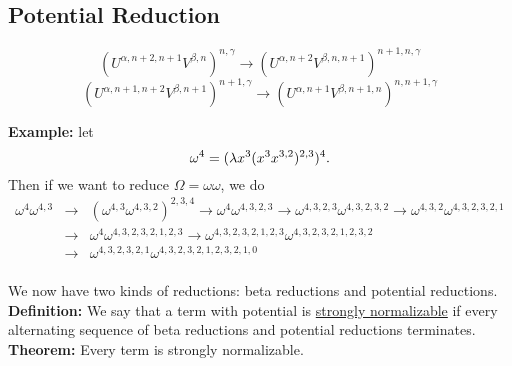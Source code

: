 \subsection{Potential Reduction}
\begin{equation*}
  (U^{\alpha,n+2,n+1}V^{\beta,n})^{n,\gamma} \rightarrow (U^{\alpha,n+2}V^{\beta,n,n+1})^{n+1,n,\gamma}
\end{equation*}
\begin{equation*}
  (U^{\alpha,n+1,n+2}V^{\beta,n+1})^{n+1,\gamma} \rightarrow (U^{\alpha,n+1}V^{\beta,n+1,n})^{n,n+1,\gamma}
\end{equation*}

\textbf{Example:}
let
\begin{equation*}
  \omega^4 = (\lambda x^3 (x^3x^{3,2})^{2,3})^4.
\end{equation*}
Then if we want to reduce $\Omega = \omega\omega$, we do
\begin{eqnarray*}
  \omega^4\omega^{4,3} &\rightarrow& (\omega^{4,3}\omega^{4,3,2})^{2,3,4} \rightarrow \omega^4 \omega^{4,3,2,3} \rightarrow \omega^{4,3,2,3}\omega^{4,3,2,3,2} \rightarrow \omega^{4,3,2} \omega^{4,3,2,3,2,1}\\
  &\rightarrow& \omega^4 \omega^{4,3,2,3,2,1,2,3} \rightarrow \omega^{4,3,2,3,2,1,2,3}\omega^{4,3,2,3,2,1,2,3,2}\\
  &\rightarrow& \omega^{4,3,2,3,2,1} \omega^{4,3,2,3,2,1,2,3,2,1,0}\\
\end{eqnarray*}

We now have two kinds of reductions: beta reductions and potential reductions.\\

\textbf{Definition:} We say that a term with potential is \uline{strongly normalizable} if every alternating sequence of beta reductions and potential reductions terminates.\\

\textbf{Theorem:} Every term is strongly normalizable.